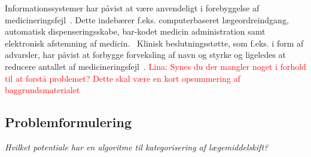 Informationssystemer har påvist at være anvendeligt i forebyggelse af medicineringsfejl~\citep{Agrawal2009}. Dette indebærer f.eks. computerbaseret lægeordreindgang, automatisk dispenseringsskabe, bar-kodet medicin administration samt elektronisk afstemning af medicin.~\citep{Agrawal2009} Klinisk beslutningsstøtte, som f.eks. i form af advarsler, har påvist at forbygge forveksling af navn og styrke og ligeledes at reducere antallet af medicineringsfejl~\citep{Campmans2018}.
\textcolor{red}{Lina: Synes du der mangler noget i forhold til at forstå problemet? Dette skal være en kort opsummering af baggrundsmaterialet}

\subsection{Problemformulering}
\centering \textit{Hvilket potentiale har en algoritme til kategorisering af lægemiddelskift?}

